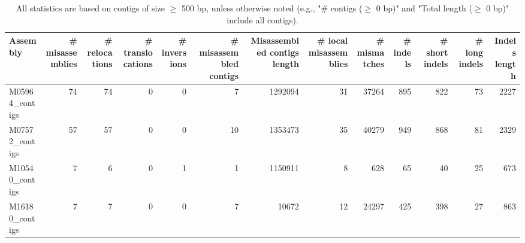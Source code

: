 \documentclass[12pt,a4paper]{article}
\begin{document}
\begin{table}[ht]
\begin{center}
\caption{All statistics are based on contigs of size $\geq$ 500 bp, unless otherwise noted (e.g., "\# contigs ($\geq$ 0 bp)" and "Total length ($\geq$ 0 bp)" include all contigs).}
\begin{tabular}{|l*{12}{|r}|}
\hline
Assembly & \# misassemblies &     \# relocations &     \# translocations &     \# inversions & \# misassembled contigs & Misassembled contigs length & \# local misassemblies & \# mismatches & \# indels &     \# short indels &     \# long indels & Indels length \\ \hline
M05964\_contigs & 74 & 74 & 0 & 0 & 7 & 1292094 & 31 & 37264 & 895 & 822 & 73 & 2227 \\ \hline
M07572\_contigs & 57 & 57 & 0 & 0 & 10 & 1353473 & 35 & 40279 & 949 & 868 & 81 & 2329 \\ \hline
M10540\_contigs & 7 & 6 & 0 & 1 & 1 & 1150911 & 8 & 628 & 65 & 40 & 25 & 673 \\ \hline
M16180\_contigs & 7 & 7 & 0 & 0 & 7 & 10672 & 12 & 24297 & 425 & 398 & 27 & 863 \\ \hline
\end{tabular}
\end{center}
\end{table}
\end{document}
